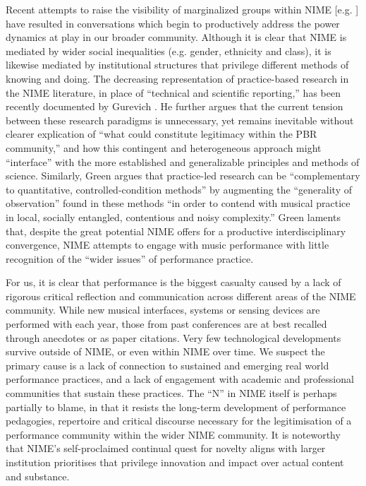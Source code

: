 Recent attempts to raise the visibility of marginalized groups within NIME [e.g. \cite{Born:2015}] have resulted in conversations which begin to productively address the power dynamics at play in our broader community.  Although it is clear that NIME is mediated by wider social inequalities (e.g. gender, ethnicity and class), it is likewise mediated by institutional structures that privilege different methods of knowing and doing. The decreasing representation of practice-based research in the NIME literature, in place of ``technical and scientific reporting,'' has been recently documented by Gurevich \cite{Gurevich:2015}. He further argues that the current tension between these research paradigms is unnecessary, yet remains inevitable without clearer explication of ``what could constitute legitimacy within the PBR community,'' and how this contingent and heterogeneous approach might ``interface'' with the more established and generalizable principles and methods of science.  Similarly, Green \cite{Green:2015} argues that practice-led research can be ``complementary to quantitative, controlled-condition methods'' by augmenting the ``generality of observation'' found in these methods ``in order to contend with musical practice in local, socially entangled, contentious and noisy complexity.'' Green laments that, despite the great potential NIME offers for a productive interdisciplinary convergence, NIME attempts to engage with music performance with little recognition of the ``wider issues'' of performance practice.

For us, it is clear that performance is the biggest casualty caused by a lack of rigorous critical reflection and communication across different areas of the NIME community. While new musical interfaces, systems or sensing devices are performed with each year, those from past conferences are at best recalled through anecdotes or as paper citations. Very few technological developments survive outside of NIME, or even within NIME over time. We suspect the primary cause is a lack of connection to sustained and emerging real world performance practices, and a lack of engagement with academic and professional communities that sustain these practices. The ``N'' in NIME itself is perhaps partially to blame, in that it resists the long-term development of performance pedagogies, repertoire and critical discourse necessary for the legitimisation of a performance community within the wider NIME community. It is noteworthy that NIME's self-proclaimed continual quest for novelty aligns with larger institution prioritises that privilege innovation and impact over actual content and substance.

